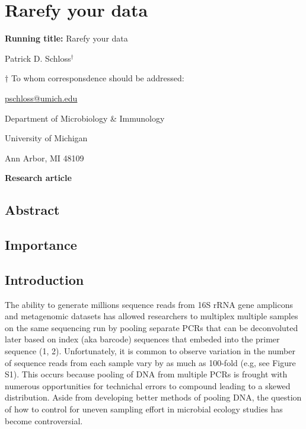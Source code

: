 \documentclass[
]{article}
\author{}
\date{\vspace{-2.5em}}
\begin{document}
\hypertarget{rarefy-your-data}{%
\section{Rarefy your data}\label{rarefy-your-data}}

\vspace{20mm}

\textbf{Running title:} Rarefy your data

\vspace{20mm}

Patrick D. Schloss\({^\dagger}\)

\vspace{40mm}

\({\dagger}\) To whom corresponsdence should be addressed:

\href{mailto:pschloss@umich.edu}{pschloss@umich.edu}

Department of Microbiology \& Immunology

University of Michigan

Ann Arbor, MI 48109

\vspace{20mm}

\textbf{Research article}

\newpage

\hypertarget{abstract}{%
\subsection{Abstract}\label{abstract}}

\hypertarget{importance}{%
\subsection{Importance}\label{importance}}

\newpage

\hypertarget{introduction}{%
\subsection{Introduction}\label{introduction}}

The ability to generate millions sequence reads from 16S rRNA gene
amplicons and metagenomic datasets has allowed researchers to multiplex
multiple samples on the same sequencing run by pooling separate PCRs
that can be deconvoluted later based on index (aka barcode) sequences
that embeded into the primer sequence (1, 2). Unfortunately, it is
common to observe variation in the number of sequence reads from each
sample vary by as much as 100-fold (e.g, see Figure S1). This occurs
because pooling of DNA from multiple PCRs is frought with numerous
opportunities for technichal errors to compound leading to a skewed
distribution. Aside from developing better methods of pooling DNA, the
question of how to control for uneven sampling effort in microbial
ecology studies has become controversial.
\end{document}
